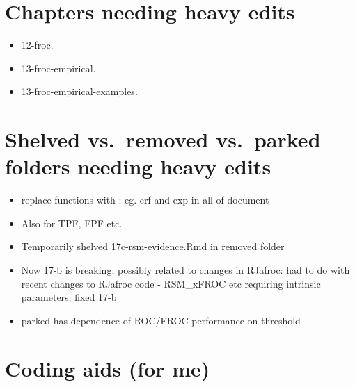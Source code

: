 \documentclass[
]{book}
\providecommand{\tightlist}{%
  \setlength{\itemsep}{0pt}\setlength{\parskip}{0pt}}
\begin{document}
\hypertarget{chapters-needing-heavy-edits}{%
\section*{Chapters needing heavy edits}\label{chapters-needing-heavy-edits}}

\begin{itemize}
\tightlist
\item
  12-froc.
\item
  13-froc-empirical.
\item
  13-froc-empirical-examples.
\end{itemize}

\hypertarget{shelved-vs.-removed-vs.-parked-folders-needing-heavy-edits}{%
\section*{Shelved vs.~removed vs.~parked folders needing heavy edits}\label{shelved-vs.-removed-vs.-parked-folders-needing-heavy-edits}}

\begin{itemize}
\tightlist
\item
  replace functions with \text{}; eg. erf and exp in all of document
\item
  Also for TPF, FPF etc.
\item
  Temporarily shelved 17c-rsm-evidence.Rmd in removed folder
\item
  Now 17-b is breaking; possibly related to changes in RJafroc: had to do with recent changes to RJafroc code - RSM\_xFROC etc requiring intrinsic parameters; fixed 17-b
\item
  parked has dependence of ROC/FROC performance on threshold
\end{itemize}

\hypertarget{coding-aids-for-me}{%
\section*{Coding aids (for me)}\label{coding-aids-for-me}}
\end{document}
